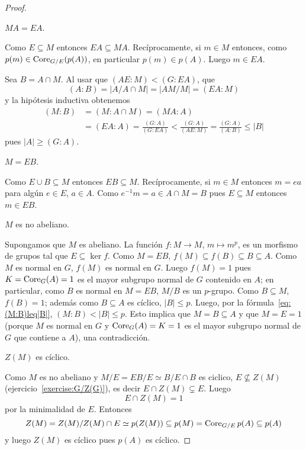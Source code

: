 \begin{proof}
	\begin{claim}
		$MA=EA$. 
	\end{claim}

	Como $E\subseteq M$ entonces $EA\subseteq MA$. Recíprocamente, si $m\in M$
	entonces, como $p(m)\in\operatorname{Core}_{G/E}(p(A))$, en particular 
	$p(m)\in p(A)$. Luego $m\in EA$. 

	\medskip
	Sea $B=A\cap M$. Al usar que $(AE:M)<(G:EA)$, 
	que
	\[
	(A:B)=|A/A\cap M|=|AM/M|=(EA:M)
	\]
	y la  hipótesis inductiva
	obtenemos
	\begin{equation}
		\label{eq:(M:B)leq|B|}
	\begin{aligned}
		(M:B)&=(M:A\cap M)=(MA:A)\\
		&=(EA:A)
		=\frac{(G:A)}{(G:EA)}
		<\frac{(G:A)}{(AE:M)}
		=\frac{(G:A)}{(A:B)}\leq |B|
	\end{aligned}
	\end{equation}
	pues $|A|\geq (G:A)$. 

	\begin{claim}
		$M=EB$.
	\end{claim}

	Como $E\cup B\subseteq M$ entonces $EB\subseteq M$. Recíprocamente, si
	$m\in M$ entonces $m=ea$ para algún $e\in E$, $a\in A$. Como $e^{-1}m=a\in
	A\cap M=B$ pues $E\subseteq M$ entonces $m\in EB$.

	\begin{claim}
		$M$ es no abeliano.
	\end{claim}

	Supongamos que $M$ es abeliano. La función $f\colon M\to M$, $m\mapsto
	m^p$, es un morfismo de grupos tal que $E \subseteq\ker f$. Como $M=EB$,
	$f(M)\subseteq f(B)\subseteq B\subseteq A$. Como $M$ es normal en $G$,
	$f(M)$ es normal en $G$. Luego $f(M)=1$ pues $K=\operatorname{Core}_G(A)=1$ es el
	mayor subgrupo normal de $G$ contenido en $A$; en particular, como $B$ es
	normal en $M=EB$, $M/B$ es un $p$-grupo. Como $B\subseteq M$,  $f(B)=1$;
	además como $B\subseteq A$ es cíclico, $|B|\leq p$. Luego, por la
	fórmula~\eqref{eq:(M:B)leq|B|}, 
	$(M:B)<|B|\leq p$. Esto implica que $M=B\subseteq A$ y que $M=E=1$ (porque
	$M$ es normal en $G$ y $\operatorname{Core}_G(A)=K=1$ es el mayor subgrupo normal de $G$
	que contiene a $A$), una contradicción.

	\begin{claim}
		$Z(M)$ es cíclico.	
	\end{claim}

	Como $M$ es no abeliano y $M/E=EB/E\simeq B/E\cap B$ es ciclico,
	$E\not\subseteq Z(M)$ (ejercicio~\ref{exercise:G/Z(G)}), es decir $E\cap
	Z(M)\subsetneq E$.  Luego 
	\begin{equation}
		\label{equation:EcapZ(M)}
		E\cap Z(M)=1
	\end{equation}
	por la minimalidad de $E$. Entonces
	\[
	Z(M)=Z(M)/Z(M)\cap E\simeq p(Z(M))\subseteq p(M)=\operatorname{Core}_{G/E}p(A)\subseteq p(A)
	\]
	y luego $Z(M)$ es cíclico pues $p(A)$ es cíclico.


\end{proof}
